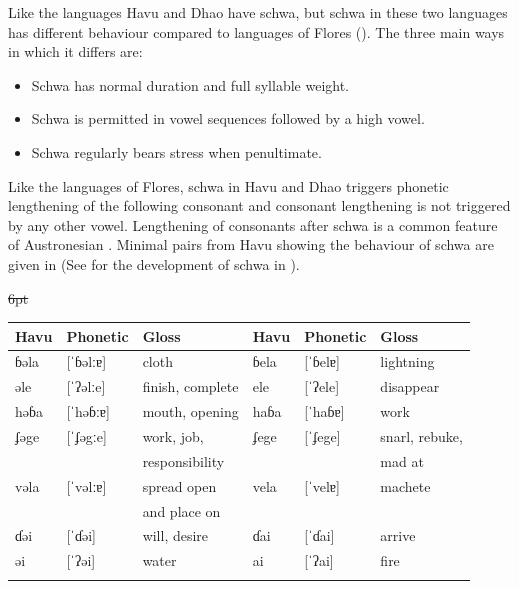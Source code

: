 Like the  languages
Havu and Dhao have schwa, but schwa in these two languages
has different behaviour compared to
languages of Flores ().
The three main ways in which it differs are:

\begin{itemize}
	\item Schwa has normal duration and full syllable weight.
	\item Schwa is permitted in vowel sequences followed by a high vowel.
	\item Schwa regularly bears stress when penultimate.
\end{itemize}

Like the languages of Flores, schwa in Havu and Dhao
triggers phonetic lengthening of the following consonant
and consonant lengthening is not triggered by any other vowel.
Lengthening of consonants after schwa is a common feature of Austronesian
\citep{Smith2023}.
Minimal pairs from Havu showing the
behaviour of schwa are given in 
(See  for the development of schwa in ).

\begin{table}
	\centering{}
	\st{6pt}\begin{tabular}{lll|lll}\lsptoprule
	Havu	&	Phonetic&	Gloss										&	Havu		&	Phonetic	&	Gloss			\\	\midrule
	ɓəla	&	[ˈɓəlːɐ]	&	cloth									& ɓela		&	[ˈɓelɐ]		&	lightning			\\
	əle		&	[ˈʔəlːe]	&	finish, complete			&	ele			&	[ˈʔele]		&	disappear	\\
	həɓa	&	[ˈhəɓːɐ]	&	mouth, opening				&	haɓa		&	[ˈhaɓɐ]		&	work			\\
	ʄəge	&	[ˈʄəgːe]	&	work, job,						&	ʄege		&	[ˈʄege]		&	snarl, rebuke,	\\
				&						&	responsibility				&					&						&	mad at	\\
	vəla	&	[ˈvəlːɐ]	&	spread open 					&	vela		&	[ˈvelɐ]		&	machete		\\
				&						&	and place on					&					&						&						\\
	ɗəi		&	[ˈɗəi]		&	will, desire					&	ɗai			&	[ˈɗai]		&	arrive		\\
	əi		&	[ˈʔəi]		&	water									&	ai			&	[ˈʔai]		&	fire			\\
		\lspbottomrule
	\end{tabular}
\end{table}

